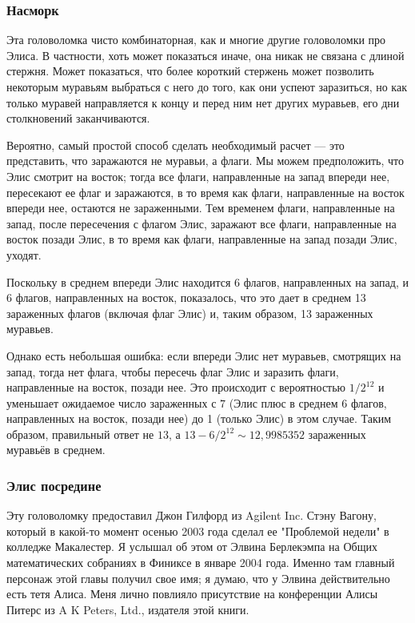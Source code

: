 \subsubsection*{Насморк}

Эта головоломка чисто комбинаторная, как и многие другие головоломки про Элиса.
В частности, хоть может показаться иначе, она никак не связана с длиной стержня.
Может показаться, что более короткий стержень может позволить некоторым муравьям выбраться с него до того, как они успеют заразиться, но как только муравей направляется к концу и перед ним нет других муравьев, его дни столкновений заканчиваются.

Вероятно, самый простой способ сделать необходимый расчет --- это представить, что заражаются не муравьи, а флаги. Мы можем предположить, что Элис смотрит на восток; тогда все флаги, направленные на запад впереди нее, пересекают ее флаг и заражаются, в то время как флаги, направленные на восток впереди нее, остаются не зараженными.
Тем временем флаги, направленные на запад, после пересечения с флагом Элис, заражают все флаги, направленные на восток позади Элис, в то время как флаги, направленные на запад позади Элис, уходят.

Поскольку в среднем впереди Элис находится 6 флагов, направленных на запад, и 6 флагов, направленных на восток, показалось, что это дает в среднем 13 зараженных флагов (включая флаг Элис) и, таким образом, 13 зараженных муравьев.

Однако есть небольшая ошибка: если впереди Элис нет муравьев, смотрящих на запад, тогда нет флага, чтобы пересечь флаг Элис и заразить флаги, направленные на восток, позади нее. Это происходит с вероятностью $1/2^{12}$ и уменьшает ожидаемое число зараженных с $7$ (Элис плюс в среднем 6 флагов, направленных на восток, позади нее) до 1 (только Элис) в этом случае.
Таким образом, правильный ответ не $13$, а $13 - 6/2^{12} \sim 12{,}9985352$ зараженных муравьёв в среднем.

\subsubsection*{Элис посредине}

Эту головоломку предоставил Джон Гилфорд из Agilent Inc.
Стэну Вагону, который в какой-то момент осенью 2003 года сделал ее "Проблемой недели" в колледже Макалестер. Я услышал об этом от Элвина Берлекэмпа на Общих математических собраниях в Финиксе в январе 2004 года.
Именно там главный персонаж этой главы получил свое имя;
я думаю, что у Элвина действительно есть тетя Алиса.
Меня лично повлияло присутствие на конференции Алисы Питерс из A K Peters, Ltd., издателя этой книги.

